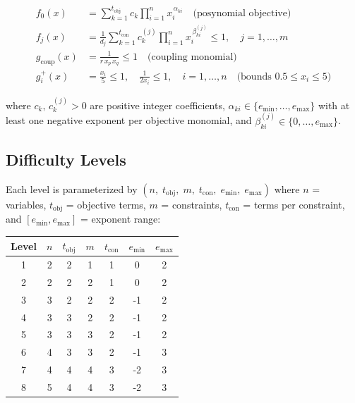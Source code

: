 \documentclass[12pt]{article}
\begin{document}
\begin{align*}
    f_0(x)     &= \sum_{k=1}^{t_{\mathrm{obj}}} c_k \prod_{i=1}^n x_i^{\,\alpha_{ki}} \quad \text{(posynomial objective)} \\[6pt]
    f_j(x)     &= \frac{1}{d_j}\sum_{k=1}^{t_{\mathrm{con}}} c_k^{(j)} \prod_{i=1}^n x_i^{\,\beta_{ki}^{(j)}} \leq 1, \quad j = 1,\ldots,m \\[4pt]
    g_{\mathrm{coup}}(x) &= \frac{1}{r \, x_p \, x_q} \leq 1 \quad \text{(coupling monomial)} \\[4pt]
    g_i^+(x)   &= \frac{x_i}{5} \leq 1, \quad \frac{1}{2 x_i} \leq 1, \quad i = 1,\ldots,n \quad \text{(bounds } 0.5 \leq x_i \leq 5\text{)}
\end{align*}

\noindent where $c_k,\, c_k^{(j)} > 0$ are positive integer coefficients,
$\alpha_{ki} \in \{e_{\min}, \ldots, e_{\max}\}$ with at least one negative exponent per objective monomial,
and $\beta_{ki}^{(j)} \in \{0, \ldots, e_{\max}\}$.

\subsection{Difficulty Levels}

Each level is parameterized by $(n,\; t_{\mathrm{obj}},\; m,\; t_{\mathrm{con}},\; e_{\min},\; e_{\max})$
where $n$ = variables, $t_{\mathrm{obj}}$ = objective terms, $m$ = constraints,
$t_{\mathrm{con}}$ = terms per constraint, and $[e_{\min}, e_{\max}]$ = exponent range:

\begin{center}
\begin{tabular}{c|cccccc}
\hline
\textbf{Level} & $n$ & $t_{\mathrm{obj}}$ & $m$ & $t_{\mathrm{con}}$ & $e_{\min}$ & $e_{\max}$ \\
\hline
1 & 2 & 2 & 1 & 1 & 0  & 2 \\
2 & 2 & 2 & 2 & 1 & 0  & 2 \\
3 & 3 & 2 & 2 & 2 & -1 & 2 \\
4 & 3 & 3 & 2 & 2 & -1 & 2 \\
5 & 3 & 3 & 3 & 2 & -1 & 2 \\
6 & 4 & 3 & 3 & 2 & -1 & 3 \\
7 & 4 & 4 & 4 & 3 & -2 & 3 \\
8 & 5 & 4 & 4 & 3 & -2 & 3 \\
\hline
\end{tabular}
\end{center}
\end{document}
